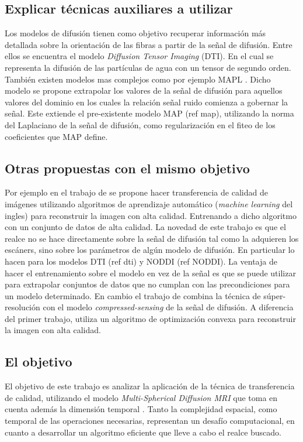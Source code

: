 \documentclass[a4paper,10pt]{article}
\begin{document}
\subsection{Explicar técnicas auxiliares a utilizar}
Los modelos de difusión tienen como objetivo recuperar información más detallada sobre la orientación de las fibras a 
partir de la señal de difusión. Entre ellos se encuentra el modelo \textit{Diffusion Tensor Imaging} (DTI). En el cual 
se representa la difusión de las partículas de agua con un tensor de segundo orden. También existen modelos mas 
complejos como por ejemplo MAPL \citep{Fick2016365}. Dicho modelo se propone extrapolar los 
valores de la se\~nal de difusión para aquellos valores del dominio en los cuales la relaci\'on 
se\~nal ruido comienza a gobernar la se\~nal. Este extiende el pre-existente modelo MAP (ref 
map), utilizando la norma del Laplaciano de la se\~nal de difusión, como regularizaci\'on en el 
fiteo de los coeficientes que MAP define.


\subsection{Otras propuestas con el mismo objetivo}
Por ejemplo en el trabajo de \citet{Alexander2014} se propone hacer transferencia de 
calidad de imágenes utilizando algoritmos de aprendizaje automático 
(\textit{machine learning} del ingles) para reconstruir la imagen con alta 
calidad. Entrenando a dicho algoritmo con un conjunto de datos de alta 
calidad. La novedad de este trabajo es que el realce no se hace directamente 
sobre la señal de difusión tal como la adquieren los escáners, sino sobre los 
parámetros de algún modelo de difusión. En particular lo hacen para los modelos DTI 
(ref dti) y NODDI (ref NODDI). La ventaja de hacer el entrenamiento sobre el modelo en vez de la 
se\~nal es que se puede utilizar para extrapolar conjuntos de datos que no cumplan con 
las precondiciones para un modelo determinado. En cambio el trabajo de \citet{Ning2016} combina la 
t\'ecnica de súper-resolución con el modelo \textit{compressed-sensing} \citep{Naidoo2015} de la señal de difusión. A 
diferencia del primer trabajo, utiliza un algoritmo de 
optimización convexa para reconstruir la imagen con alta calidad.

\subsection{El objetivo}
El objetivo de este trabajo es analizar la aplicación de la técnica de 
transferencia de calidad, utilizando el modelo \textit{Multi-Spherical Diffusion MRI} que toma en cuenta además 
la dimensión temporal \citep{Fick}. Tanto la complejidad espacial, como temporal de las 
operaciones necesarias, representan un desafío computacional, en cuanto a 
desarrollar un algoritmo eficiente que lleve a cabo el realce buscado.





\clearpage


\end{document}
